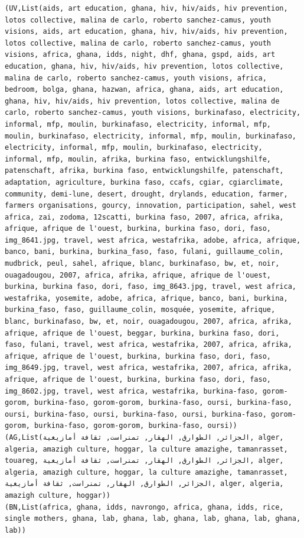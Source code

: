 \documentclass[11pt]{article}
\begin{document}
\begin{lstlisting}
(UV,List(aids, art education, ghana, hiv, hiv/aids, hiv prevention, lotos collective, malina de carlo, roberto sanchez-camus, youth visions, aids, art education, ghana, hiv, hiv/aids, hiv prevention, lotos collective, malina de carlo, roberto sanchez-camus, youth visions, africa, ghana, idds, night, dhf, ghana, gspd, aids, art education, ghana, hiv, hiv/aids, hiv prevention, lotos collective, malina de carlo, roberto sanchez-camus, youth visions, africa, bedroom, bolga, ghana, hazwan, africa, ghana, aids, art education, ghana, hiv, hiv/aids, hiv prevention, lotos collective, malina de carlo, roberto sanchez-camus, youth visions, burkinafaso, electricity, informal, mfp, moulin, burkinafaso, electricity, informal, mfp, moulin, burkinafaso, electricity, informal, mfp, moulin, burkinafaso, electricity, informal, mfp, moulin, burkinafaso, electricity, informal, mfp, moulin, afrika, burkina faso, entwicklungshilfe, patenschaft, afrika, burkina faso, entwicklungshilfe, patenschaft, adaptation, agriculture, burkina faso, ccafs, cgiar, cgiarclimate, community, demi-lune, desert, drought, drylands, education, farmer, farmers organisations, gourcy, innovation, participation, sahel, west africa, zai, zodoma, 12scatti, burkina faso, 2007, africa, afrika, afrique, afrique de l'ouest, burkina, burkina faso, dori, faso, img_8641.jpg, travel, west africa, westafrika, adobe, africa, afrique, banco, bani, burkina, burkina_faso, faso, fulani, guillaume_colin, mudbrick, peul, sahel, afrique, blanc, burkinafaso, bw, et, noir, ouagadougou, 2007, africa, afrika, afrique, afrique de l'ouest, burkina, burkina faso, dori, faso, img_8643.jpg, travel, west africa, westafrika, yosemite, adobe, africa, afrique, banco, bani, burkina, burkina_faso, faso, guillaume_colin, mosquée, yosemite, afrique, blanc, burkinafaso, bw, et, noir, ouagadougou, 2007, africa, afrika, afrique, afrique de l'ouest, beggar, burkina, burkina faso, dori, faso, fulani, travel, west africa, westafrika, 2007, africa, afrika, afrique, afrique de l'ouest, burkina, burkina faso, dori, faso, img_8649.jpg, travel, west africa, westafrika, 2007, africa, afrika, afrique, afrique de l'ouest, burkina, burkina faso, dori, faso, img_8602.jpg, travel, west africa, westafrika, burkina-faso, gorom-gorom, burkina-faso, gorom-gorom, burkina-faso, oursi, burkina-faso, oursi, burkina-faso, oursi, burkina-faso, oursi, burkina-faso, gorom-gorom, burkina-faso, gorom-gorom, burkina-faso, oursi))
(AG,List(الجزائر, الطوارق, الهقار, تمنراست, ثقافة أمازيغية, alger, algeria, amazigh culture, hoggar, la culture amazighe, tamanrasset, touareg, الجزائر, الطوارق, الهقار, تمنراست, ثقافة أمازيغية, alger, algeria, amazigh culture, hoggar, la culture amazighe, tamanrasset, الجزائر, الطوارق, الهقار, تمنراست, ثقافة أمازيغية, alger, algeria, amazigh culture, hoggar))
(BN,List(africa, ghana, idds, navrongo, africa, ghana, idds, rice, single mothers, ghana, lab, ghana, lab, ghana, lab, ghana, lab, ghana, lab))
\end{lstlisting}
\end{document}

